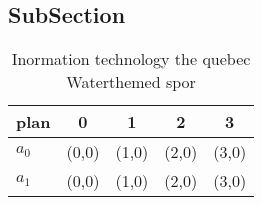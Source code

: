 \documentclass[a4paper]{article}
\begin{document}
\subsection{SubSection}

\begin{table}
\begin{adjustbox}{width=0.7\columnwidth}
\begin{tabular}{|l|l|l|l|l|}
\hline
\textbf{plan} & \multicolumn{1}{c|}{\textbf{0}} & \multicolumn{1}{c|}{\textbf{1}} & \multicolumn{1}{c|}{\textbf{2}} & \multicolumn{1}{c|}{\textbf{3}} \\ \hline
\textbf{$a_0$}  & (0,0) & (1,0) & (2,0) & (3,0) \\ \hline
\textbf{$a_1$}  & (0,0) & (1,0) & (2,0) & (3,0) \\ \hline
\end{tabular}
\end{adjustbox}
\caption{Inormation technology the quebec Waterthemed spor
}
\end{table}
\end{document}
